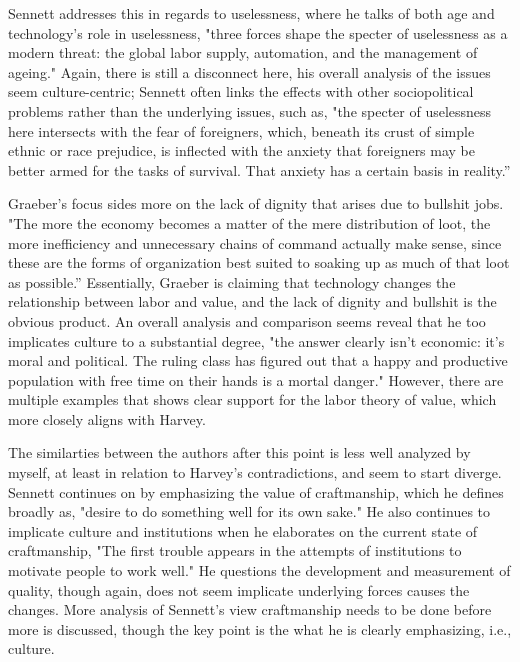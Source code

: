 \documentclass[12pt,a4paper]{article}
\begin{document}
Sennett addresses this in regards to uselessness, where he talks of both age and technology's role in uselessness, "three forces shape the specter of uselessness as a modern threat: the global labor supply, automation, and the management of ageing." \cite{new} Again, there is still a disconnect here, his overall analysis of the issues seem culture-centric; Sennett often links the effects with other sociopolitical problems rather than the underlying issues, such as, "the specter of uselessness here intersects with the fear of foreigners, which, beneath its crust of simple ethnic or race prejudice, is inflected with the anxiety that foreigners may be better armed for the tasks of survival. That anxiety has a certain basis in reality.” \cite{new} 
\vspace*{10pt}

Graeber's focus sides more on the lack of dignity that arises due to bullshit jobs. "The more the economy becomes a matter of the mere distribution of loot, the more inefficiency and unnecessary chains of command actually make sense, since these are the forms of organization best suited to soaking up as much of that loot as possible.” \cite{bs} Essentially, Graeber is claiming that technology changes the relationship between labor and value, and the lack of dignity and bullshit is the obvious product. An overall analysis and comparison seems reveal that he too implicates culture to a substantial degree, "the answer clearly isn't economic: it's moral and political. The ruling class has figured out that a happy and productive population with free time on their hands is a mortal danger." \cite{bs} However, there are multiple examples that shows clear support for the labor theory of value, which more closely aligns with Harvey. 
\vspace*{10pt}

The similarties between the authors after this point is less well analyzed by myself, at least in relation to Harvey's contradictions, and seem to start diverge. Sennett continues on by emphasizing the value of craftmanship, which he defines broadly as, "desire to do something well for its own sake." \cite{craft} He also continues to implicate culture and institutions when he elaborates on the current state of craftmanship, "The first trouble appears in the attempts of institutions to motivate people to work well." \cite{craft} He questions the development and measurement of quality, though again, does not seem implicate underlying forces causes the changes. More analysis of Sennett's view craftmanship needs to be done before more is discussed, though the key point is the what he is clearly emphasizing, i.e., culture. 
\end{document}
